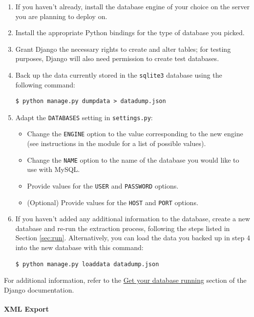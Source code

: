 \begin{enumerate}
\item If you haven't already, install the database engine of your
  choice on the server you are planning to deploy on.
\item Install the appropriate Python bindings for the type of database
  you picked.
\item Grant Django the necessary rights to create and alter tables;
  for testing purposes, Django will also need permission to create
  test databases.
\item Back up the data currently stored in the \texttt{sqlite3}
  database using the following command:
\begin{verbatim}
$ python manage.py dumpdata > datadump.json
\end{verbatim}
\item Adapt the \texttt{DATABASES} setting in \texttt{settings.py}:
  \begin{itemize}
  \item Change the \texttt{ENGINE} option to the value corresponding
    to the new engine (see instructions in the module for a list of
    possible values).
  \item Change the \texttt{NAME} option to the name of the database
    you would like to use with MySQL.
  \item Provide values for the \texttt{USER} and \texttt{PASSWORD}
    options.
  \item (Optional) Provide values for the \texttt{HOST} and
    \texttt{PORT} options.
  \end{itemize}
\item If you haven't added any additional information to the database,
  create a new database and re-run the extraction process, following
  the steps listed in Section \ref{sec:run}. Alternatively, you can
  load the data you backed up in step 4 into the new database with
  this command:
\begin{verbatim}
$ python manage.py loaddata datadump.json
\end{verbatim}
\end{enumerate}

For additional information, refer to the
\href{https://docs.djangoproject.com/en/1.4/topics/install/#database-installation}{Get
your database running} section of the Django documentation.

\paragraph{XML Export}

